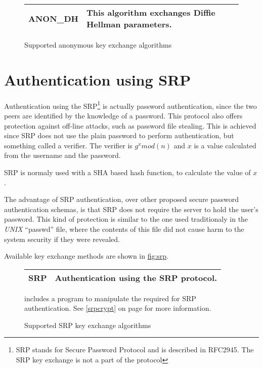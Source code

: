 \begin{figure}[hbtp]
\begin{tabular}{|l|p{9cm}|}

\hline
ANON\_DH & This algorithm exchanges Diffie Hellman parameters. 
\\
\hline
\end{tabular}

\caption{Supported anonymous key exchange algorithms}
\label{fig:anon}

\end{figure}

\section{Authentication using SRP}
Authentication using the SRP\footnote{SRP stands for Secure Password Protocol and 
is described in RFC2945. The SRP key exchange is not a part of the \tlsI{} protocol}
is actually password authentication, since the two peers are identified by the knowledge of a password. 
This protocol also offers protection against off-line attacks, such as password 
file stealing. 
This is achieved since SRP does not use the plain password to perform authentication, but something called a 
verifier. The verifier is $g^{x}mod(n)$ and $x$ is a value calculated
from the username and the password. 
\par SRP is normaly used with a SHA based hash function, to calculate
the value of $x$. 
\par The advantage of SRP authentication, over other proposed secure password 
authentication schemas, is that SRP does not require the server to hold
the user's password. This kind of protection is similar to the one used traditionaly
in the \emph{UNIX} ``passwd'' file, where the contents of this file did not cause
harm to the system security if they were revealed.
\par
Available key exchange methods are shown in \hyperref{figure}{figure }{}{fig:srp}.

\begin{figure}[hbtp]
\begin{tabular}{|l|p{9cm}|}

\hline
SRP & Authentication using the SRP protocol. 
\\
\hline
\end{tabular}

\caption{Supported SRP key exchange algorithms}
\label{fig:srp}

\gnutls{} includes a program to manipulate the required for SRP
authentication. See \ref{srpcrypt} on page \pageref{srpcrypt} for
more information.

\end{figure}


